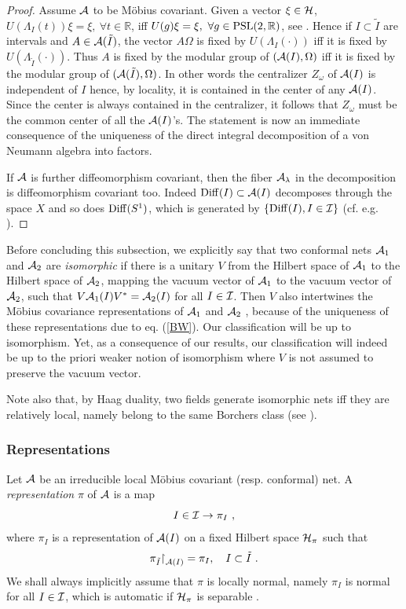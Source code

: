 \documentclass[12pt]{article}
\def\Diff{{\rm Diff}}
\def\Om{\Omega}
\def\res{{\upharpoonright}}
\def\PSL{{{\rm PSL}(2,\mathbb R)}}
\def\A{{\cal A}}
\def\I{{\cal I}}
\def\H{{\cal H}}
\begin{document}
\begin{proof}
Assume $\A$ to  be M\"{o}bius covariant.
Given a vector $\xi\in\H$, $U(\Lambda_I (t))\xi=\xi, \ \forall t\in\mathbb 
R$, iff $U(g)\xi=\xi, \ \forall g\in\PSL$, see
\cite{GL2}. Hence if $I\subset\tilde I$ are intervals and 
$A\in\A(\tilde I)$, the vector $A\Om$ is fixed by $U(\Lambda_I 
(\cdot))$ iff it is fixed by $U(\Lambda_{\tilde I} 
(\cdot))$. Thus $A$ is fixed by the modular group of $(\A(I),\Om)$ iff 
it is fixed by the modular group of $(\A(\tilde I),\Om)$. In other 
words the centralizer $Z_{\omega}$ of $\A(I)$ is independent of $I$ 
hence, by locality, it is contained in the center of any $\A(I)$. 
Since the center is always contained in the centralizer, it follows 
that $Z_{\omega}$ must be the common center of all the $\A(I)$'s. 
The statement is now an immediate consequence of the uniqueness of the 
direct integral decomposition of a von Neumann algebra into factors.

If $\A$ is further diffeomorphism covariant, then the fiber 
$\A_{\lambda}$ in the decomposition is diffeomorphism covariant 
too. Indeed $\Diff(I)\subset\A(I)$ decomposes through the space $X$ and so 
does $\Diff(S^1)$, which
is generated by $\{\Diff(I), I\in\I\}$ (cf. e.g. \cite{Lk}). 
\end{proof}

Before concluding this subsection, we explicitly say that 
two conformal nets $\A_1$ and $\A_2$ are  {\it isomorphic} if there is 
a unitary $V$ from the Hilbert space of $\A_1$ to the Hilbert space of
$\A_2$, mapping the vacuum vector of $\A_1$ to the vacuum 
vector of $\A_2$, such that  $V\A_1(I)V^*=\A_2(I)$ for all $I\in\I$. 
Then $V$ also intertwines the M\"{o}bius
covariance representations of $\A_1$ and $\A_2$ \cite{BGL},
because of the uniqueness of these representations due to eq. (\ref{BW}). 
Our classification will be up to isomorphism. Yet, as a consequence of our 
results, our classification will indeed be up to the 
priori weaker notion of isomorphism where $V$ is not assumed to 
preserve the vacuum vector.
 
Note also that, by Haag duality, two fields 
generate isomorphic nets iff they are relatively local, namely
belong to the same Borchers class (see \cite{H}).

\subsubsection{Representations}
\label{Rep}

Let $\A$ be an irreducible local M\"{o}bius covariant (resp.
conformal) net. A {\it representation} 
$\pi$ of $\A$ is a map
\[
I\in\I\to\pi_I\ ,
\]
where $\pi_I$ is a representation of $\A(I)$ on a fixed Hilbert space 
$\H_{\pi}$ such that
\[ 
\pi_{\tilde I}\res_{\A(I)}=\pi_I, \quad I\subset\tilde I\ .
\]
We shall always implicitly assume that $\pi$ is locally normal, namely
$\pi_I$ is normal for all $I\in\I$, which is automatic if $\H_{\pi}$ is 
separable \cite{T}.
\end{document}
